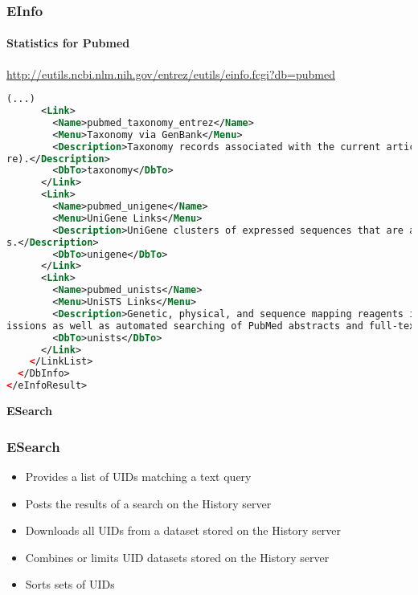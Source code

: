 \documentclass{beamer}
\newcommand{\centeredtitle}[1]{
\begin{center}
    \Huge{\bf{#1}}
\end{center}
}
\newcommand{\hugeslide}[1]{
\begin{frame}
\centeredtitle{#1}
\end{frame}
}
\begin{document}
\begin{frame}[fragile]
\frametitle{EInfo}
\framesubtitle{Statistics for Pubmed}
\url{http://eutils.ncbi.nlm.nih.gov/entrez/eutils/einfo.fcgi?db=pubmed}
\begin{lstlisting}[language=xml,basicstyle=\tiny,breaklines=false]
(...)
      <Link>
        <Name>pubmed_taxonomy_entrez</Name>
        <Menu>Taxonomy via GenBank</Menu>
        <Description>Taxonomy records associated with the current articles through taxonomic information on related molecular database records (Nucleotide, Protein, Gene, SNP, Structu
re).</Description>
        <DbTo>taxonomy</DbTo>
      </Link>
      <Link>
        <Name>pubmed_unigene</Name>
        <Menu>UniGene Links</Menu>
        <Description>UniGene clusters of expressed sequences that are associated with the current articles through references on the clustered sequence records and related Gene record
s.</Description>
        <DbTo>unigene</DbTo>
      </Link>
      <Link>
        <Name>pubmed_unists</Name>
        <Menu>UniSTS Links</Menu>
        <Description>Genetic, physical, and sequence mapping reagents in the UniSTS database associated with the current articles through references on sequence tagged site (STS) subm
issions as well as automated searching of PubMed abstracts and full-text PubMed Central articles for marker names.</Description>
        <DbTo>unists</DbTo>
      </Link>
    </LinkList>
  </DbInfo>
</eInfoResult>
\end{lstlisting}
\end{frame}




\hugeslide{ESearch}

\begin{frame}[fragile]
\frametitle{ESearch}
\begin{itemize}
\item Provides a list of UIDs matching a text query
\item Posts the results of a search on the History server
\item Downloads all UIDs from a dataset stored on the History server
\item Combines or limits UID datasets stored on the History server
\item Sorts sets of UIDs
\end{itemize}
\end{frame}
\end{document}
